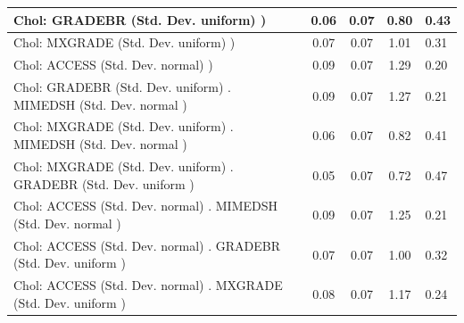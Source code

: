 \begin{table}
\begin{center}
\begin{tabular}{|l|l|c|c|c|l|}
			\hline
			 Chol: GRADEBR (Std. Dev. uniform) ) &  & 0.06 & 0.07 & 0.80 & 0.43 \\
			\hline
			 Chol: MXGRADE (Std. Dev. uniform) ) &  & 0.07 & 0.07 & 1.01 & 0.31 \\
			\hline
			 Chol: ACCESS (Std. Dev. normal) ) &  & 0.09 & 0.07 & 1.29 & 0.20 \\
			\hline
			 Chol: GRADEBR (Std. Dev. uniform) . MIMEDSH (Std. Dev.   normal ) &  & 0.09 & 0.07 & 1.27 & 0.21 \\
			\hline
			 Chol: MXGRADE (Std. Dev. uniform) . MIMEDSH (Std. Dev.   normal ) &  & 0.06 & 0.07 & 0.82 & 0.41 \\
			\hline
			 Chol: MXGRADE (Std. Dev. uniform) . GRADEBR (Std. Dev.   uniform ) &  & 0.05 & 0.07 & 0.72 & 0.47 \\
			\hline
			 Chol: ACCESS (Std. Dev. normal) . MIMEDSH (Std. Dev.   normal ) &  & 0.09 & 0.07 & 1.25 & 0.21 \\
			\hline
			 Chol: ACCESS (Std. Dev. normal) . GRADEBR (Std. Dev.   uniform ) &  & 0.07 & 0.07 & 1.00 & 0.32 \\
			\hline
			 Chol: ACCESS (Std. Dev. normal) . MXGRADE (Std. Dev.   uniform ) &  & 0.08 & 0.07 & 1.17 & 0.24 \\
			\hline
		\end{tabular}
	\end{center}
\end{table}